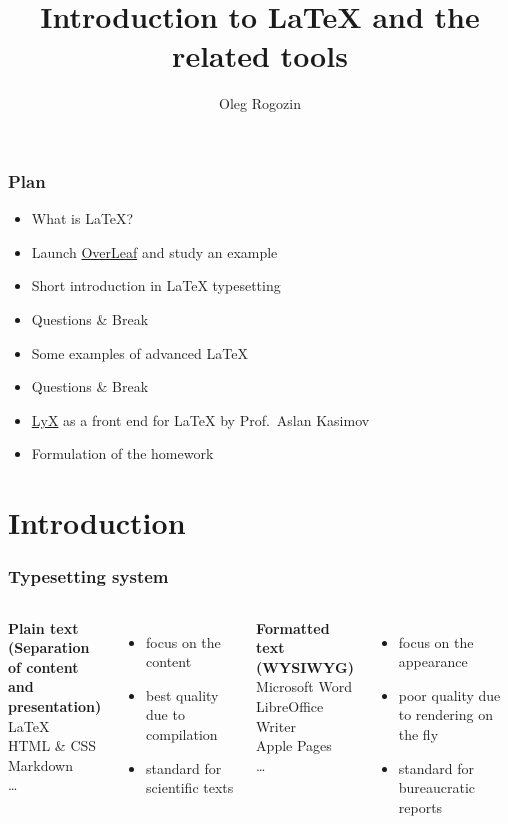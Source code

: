 \documentclass[mathserif]{beamer}
\title{Introduction to \textrm{\LaTeX} and the related tools}
\author{Oleg Rogozin}
\institute{Skolkovo Institute of Science and Technology, Russia}
\date{}
\begin{document}
\frame{\titlepage}

\begin{frame}
  \frametitle{Plan}
  \begin{itemize}
      \item What is \textrm{\LaTeX}?
      \item Launch \href{https://overleaf.com}{OverLeaf} and study an example
      \item Short introduction in \textrm{\LaTeX} typesetting
      \item Questions \& Break
      \item Some examples of advanced \textrm{\LaTeX}
      \item Questions \& Break
      \item \href{https://www.lyx.org}{LyX} as a front end for \textrm{\LaTeX} by Prof.~Aslan Kasimov
      \item Formulation of the homework
  \end{itemize}
\end{frame}

\section{Introduction}

\begin{frame}
    \frametitle{Typesetting system}
    \centering
    \begin{columns}[T]
		\centering\Large
		\textbf{Plain text \\[5pt] {\footnotesize (Separation of content \\[-10pt] and presentation)}} \\[10pt]
		\textrm{\LaTeX} \\ HTML \& CSS \\ Markdown \\ \dots \\[10pt]
		\footnotesize
		\begin{itemize}
		    \item focus on the content
		    \item best quality due to compilation
		    \item standard for scientific texts
		\end{itemize}

		\centering\Large
		\textbf{Formatted text \\ (WYSIWYG)} \\[18pt]
		Microsoft Word \\ LibreOffice Writer \\ Apple Pages \\ \dots \\[10pt]
		\footnotesize
		\begin{itemize}
		    \item focus on the appearance
		    \item poor quality due to rendering on the fly
		    \item standard for bureaucratic reports
		\end{itemize}
	\end{columns}
\end{frame}
\end{document}
